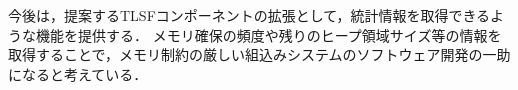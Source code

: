 \documentclass[submit,techrep]{ipsj_v2/UTF8/ipsj}
\begin{document}
今後は，提案するTLSFコンポーネントの拡張として，統計情報を取得できるような機能を提供する．
メモリ確保の頻度や残りのヒープ領域サイズ等の情報を取得することで，メモリ制約の厳しい組込みシステムのソフトウェア開発の一助になると考えている．




\end{document}

